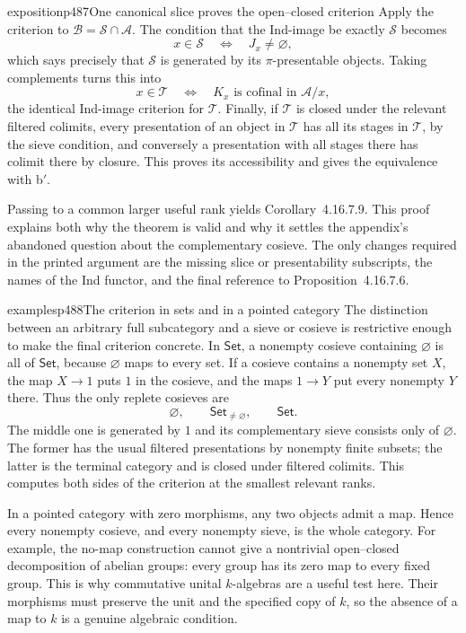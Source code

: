 \begin{dcomment}{exposition}{p487}{One canonical slice proves the open--closed criterion}
Apply the criterion to $\mathcal B=\mathcal S\cap\mathcal A$. The condition that the Ind-image be exactly $\mathcal S$ becomes
\[
 x\in\mathcal S
 \quad\Longleftrightarrow\quad
 J_x\ne\varnothing,
\]
which says precisely that $\mathcal S$ is generated by its $\pi$-presentable objects. Taking complements turns this into
\[
 x\in\mathcal T
 \quad\Longleftrightarrow\quad
 K_x\text{ is cofinal in }\mathcal A/x,
\]
the identical Ind-image criterion for $\mathcal T$. Finally, if $\mathcal T$ is closed under the relevant filtered colimits, every presentation of an object in $\mathcal T$ has all its stages in $\mathcal T$, by the sieve condition, and conversely a presentation with all stages there has colimit there by closure. This proves its accessibility and gives the equivalence with b$'$.

Passing to a common larger useful rank yields Corollary~4.16.7.9. This proof explains both why the theorem is valid and why it settles the appendix's abandoned question about the complementary cosieve. The only changes required in the printed argument are the missing slice or presentability subscripts, the names of the Ind functor, and the final reference to Proposition~4.16.7.6.
\end{dcomment}

\begin{dcomment}{examples}{p488}{The criterion in sets and in a pointed category}
The distinction between an arbitrary full subcategory and a sieve or cosieve is restrictive enough to make the final criterion concrete. In $\mathsf{Set}$, a nonempty cosieve containing $\varnothing$ is all of $\mathsf{Set}$, because $\varnothing$ maps to every set. If a cosieve contains a nonempty set $X$, the map $X\to1$ puts $1$ in the cosieve, and the maps $1\to Y$ put every nonempty $Y$ there. Thus the only replete cosieves are
\[
 \varnothing,\qquad\mathsf{Set}_{\ne\varnothing},\qquad\mathsf{Set}.
\]
The middle one is generated by $1$ and its complementary sieve consists only of $\varnothing$. The former has the usual filtered presentations by nonempty finite subsets; the latter is the terminal category and is closed under filtered colimits. This computes both sides of the criterion at the smallest relevant ranks.

In a pointed category with zero morphisms, any two objects admit a map. Hence every nonempty cosieve, and every nonempty sieve, is the whole category. For example, the no-map construction cannot give a nontrivial open--closed decomposition of abelian groups: every group has its zero map to every fixed group. This is why commutative unital $k$-algebras are a useful test here. Their morphisms must preserve the unit and the specified copy of $k$, so the absence of a map to $k$ is a genuine algebraic condition.
\end{dcomment}


